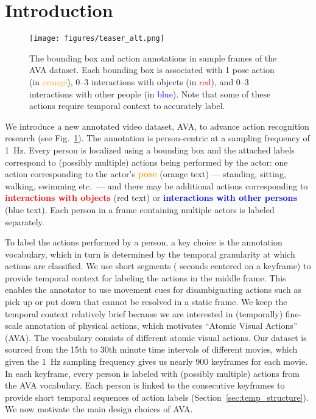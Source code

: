 \documentclass[10pt,twocolumn,letterpaper]{article}
\begin{document}
\vspace{-2em}
\section{Introduction}
\label{sec:introduction}


\begin{figure}[t]
\texttt{[image: figures/teaser\_alt.png]}
\caption{The bounding box and action annotations in sample frames of the AVA dataset. Each bounding box is associated with 1 pose action (in \textcolor{orange}{orange}), 0--3 interactions with objects (in \textcolor{red}{red}), and 0--3 interactions with other people (in \textcolor{blue}{blue}). Note that some of these actions require temporal context to accurately label.
\label{fig:teaser}
}
\vspace{-1em}
\end{figure}

We introduce a new annotated video dataset, AVA, to advance action recognition research (see Fig.~\ref{fig:teaser}). The annotation is person-centric at a sampling frequency of 1~Hz. Every person is localized using a bounding box and the attached labels correspond to (possibly multiple) actions being performed by the actor: one action corresponding to the actor's \textbf{\textcolor{orange}{pose}} (orange text) --- standing, sitting, walking, swimming etc.\ --- and there may be additional actions corresponding to \textbf{\textcolor{red}{interactions with objects}} (red text) or \textbf{\textcolor{blue}{interactions with other persons}} (blue text). Each person in a frame containing multiple actors is labeled separately.

To label the actions performed by a person, a key choice is the annotation vocabulary, which in turn is determined by the temporal granularity at which actions are classified. We use short segments ( seconds centered on a keyframe) to provide temporal context for labeling the actions in the middle frame. This enables the annotator to use movement cues for disambiguating actions such as pick up or put down that cannot be resolved in a static frame. We keep the temporal context relatively brief because we are interested in (temporally) fine-scale  annotation of physical actions, which  motivates ``Atomic Visual Actions'' (AVA). The vocabulary consists of \numClasses{} different atomic visual actions. Our dataset is sourced from the 15th to 30th minute time intervals of \numMovies{} different movies, which given the 1~Hz sampling frequency gives us nearly 900 keyframes for each movie.  In each keyframe, every person is labeled with (possibly multiple) actions from the AVA vocabulary. Each person is linked to the consecutive keyframes to provide short temporal sequences of action labels (Section~\ref{sec:temp_structure}). We now motivate the main design choices of AVA.
\end{document}
